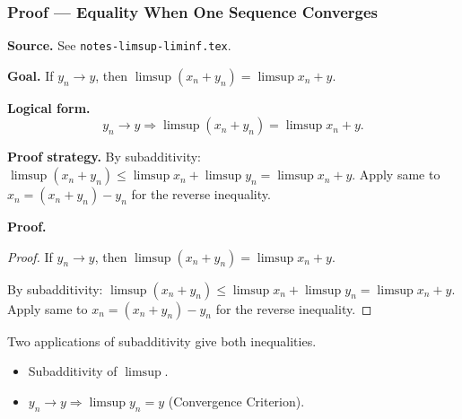 
\clearpage
{}
\hypertarget{proof-RA-ABB-T-limsup-equality-one-conv}{}

\subsubsection[Equality When One Sequence Converges]{Proof --- Equality When One Sequence Converges}

\bigskip

\noindent
\textbf{Source.} See \texttt{notes-limsup-liminf.tex}.

\vspace{0.75em}

\noindent
\textbf{Goal.} If $y_n \to y$, then $\limsup(x_n + y_n) = \limsup x_n + y$.

\vspace{0.75em}

\noindent
\textbf{Logical form.}
\[
  y_n \to y \Rightarrow \limsup(x_n + y_n) = \limsup x_n + y.
\]

\vspace{0.75em}

\noindent
\textbf{Proof strategy.} By subadditivity: $\limsup(x_n + y_n) \le \limsup x_n + \limsup y_n = \limsup x_n + y$. Apply same to $x_n = (x_n+y_n) - y_n$ for the reverse inequality.

\vspace{0.75em}

\noindent
\textbf{Proof.}
\begin{proof}
\Claim If $y_n \to y$, then $\limsup(x_n + y_n) = \limsup x_n + y$.

\Given 

\Goal 

\Strategy By subadditivity: $\limsup(x_n + y_n) \le \limsup x_n + \limsup y_n = \limsup x_n + y$. Apply same to $x_n = (x_n+y_n) - y_n$ for the reverse inequality.

\medskip


\end{proof}

\begin{remark*}
Two applications of subadditivity give both inequalities.
\end{remark*}

\begin{remark*}[Dependencies]
\begin{itemize}
  \item Subadditivity of $\limsup$.
  \item $y_n \to y \Rightarrow \limsup y_n = y$ (Convergence Criterion).
\end{itemize}
\end{remark*}
